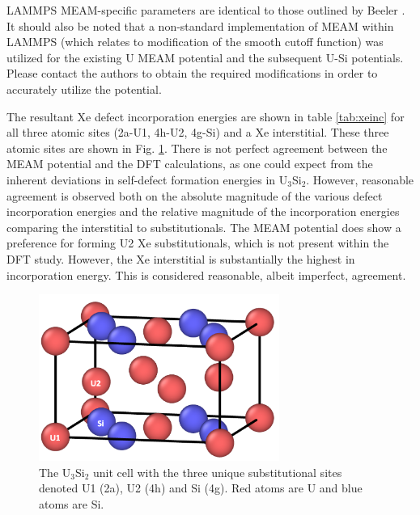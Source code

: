 \documentclass[review]{elsarticle}
\providecommand{\DIFaddtex}[1]{{\protect\color{blue} \sf #1}} %
\providecommand{\DIFaddbegin}{} %
\providecommand{\DIFaddend}{} %
\providecommand{\DIFaddFL}[1]{\DIFadd{#1}} %
\providecommand{\DIFadd}[1]{\texorpdfstring{\DIFaddtex{#1}}{#1}} %
\newcommand{\DIFaddincludegraphics}[2][]{{\color{blue}\fbox{\DIFOincludegraphics[#1]{#2}}}} %
\DeclareRobustCommand{\DIFaddbegin}{\DIFOaddbegin \let\includegraphics\DIFaddincludegraphics} %
\DeclareRobustCommand{\DIFaddend}{\DIFOaddend \let\includegraphics\DIFOincludegraphics} %
\begin{document}
\DIFaddend \FloatBarrier

LAMMPS MEAM-specific parameters are identical to those outlined by Beeler \cite{beelerusi}. It should also be noted that a non-standard implementation of MEAM within LAMMPS (which relates to modification of the smooth cutoff function) was utilized for the existing U MEAM potential and the subsequent U-Si potentials. Please contact the authors to obtain the required modifications in order to accurately utilize the potential. 

The resultant Xe defect incorporation energies are shown in table \ref{tab:xeinc} for all three atomic sites (2a-U1, 4h-U2, 4g-Si) and a Xe interstitial. \DIFaddbegin \DIFadd{These three atomic sites are shown in Fig. \ref{fig:defect_sites}. }\DIFaddend There is not perfect agreement between the MEAM potential and the DFT calculations, as one could expect from the inherent deviations in self-defect formation energies in U$_3$Si$_2$. However, reasonable agreement is observed both on the absolute magnitude of the various defect incorporation energies and the relative magnitude of the incorporation energies comparing the interstitial to substitutionals. The MEAM potential does show a preference for forming U2 Xe substitutionals, which is not present within the DFT study. However, the Xe interstitial is substantially the highest in incorporation energy. This is considered reasonable, albeit imperfect, agreement. 

\DIFaddbegin \begin{figure}[hbt]
	\centering
	\includegraphics[width=0.7\textwidth]{defect_sites.png}
 \caption{ \DIFaddFL{The U$_3$Si$_2$ unit cell with the three unique substitutional sites denoted U1 (2a), U2 (4h) and Si (4g). Red atoms are U and blue atoms are Si. }}\label{fig:defect_sites}
\end{figure}
\end{document}
